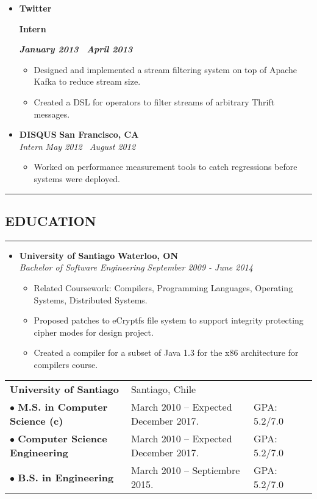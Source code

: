 \documentclass[10pt,letterpaper]{article}
\newcommand\textbox[1]{%
  \parbox{.333\textwidth}{#1}%
}
\newcommand{\sectionTitle}[1]{
  \hrule
  \vspace{-1.0em} 
  \subsection*{\uppercase{\textbf{#1}}}
  \vspace{-0.3em}
    \hrule
    \vspace{0.5em}  
}
\newcommand{\titleExperienceWithoutLocation}[4]{
  \item[]
  {
    \textbox{\textbf{#1}\hfill}\textbox{\hfil \textbf{#2}\hfil}\hfill \textbf{\emph{#3 \textendash \ #4}}
  }
}
\newcommand{\titleExperienceWithLocation}[5]{
  \item[]
  {
    \textbf{#1} \hfill
    \textbf{#2}
  }
  \\{\emph{#3} \hfill \emph{#4 \textendash \ #5}}
}
\begin{document}
\begin{itemize}[leftmargin=*]
    \titleExperienceWithoutLocation{Twitter}{Intern}{January 2013}{April 2013}
    \begin{itemize}[label=\textbullet]
      \itemsep0em
      \item Designed and implemented a stream filtering system on top of Apache
      Kafka to reduce stream size.
      \item Created a DSL for operators to filter streams of arbitrary Thrift
      messages.
    \end{itemize}
    
    \titleExperienceWithLocation{DISQUS}{San Francisco, CA}{Intern}{May 2012}{August 2012}
    \begin{itemize}[label=\textbullet]
      \itemsep0em
      \item Worked on performance measurement tools to catch regressions before
      systems were deployed.
    \end{itemize}
    
  \end{itemize}
  
  \sectionTitle{Education}  
  \begin{itemize}[leftmargin=*]
    \parskip=-0.5em
    
    \item[]
    {\textbf{University of Santiago} \hfill
      \textbf{Waterloo, ON}
    }
    \\
    {\emph{Bachelor of Software Engineering} \hfill
      \emph{September 2009 - June 2014}}
    
    \begin{itemize}[label=\textbullet]
      \item Related Coursework: Compilers, Programming Languages, Operating
      Systems, Distributed Systems.
      \item Proposed patches to eCryptfs file system to support
      integrity protecting cipher modes for design project.
      \item Created a compiler for a subset of Java 1.3 for the
      x86 architecture for compilers course.
    \end{itemize}
  \end{itemize}
  
  \begin{tabular}{lllc} 
    \textbf{University of Santiago}&Santiago, Chile& & \\
    $\bullet$ \textbf{M.S. in Computer Science (c)}& March 2010 – Expected December 2017. & GPA: 5.2/7.0 & \\
    $\bullet$ \textbf{Computer Science Engineering} & March 2010 – Expected December 2017. & GPA: 5.2/7.0 & \\
    $\bullet$ \textbf{B.S. in Engineering} & March 2010 – Septiembre 2015. & GPA: 5.2/7.0  &\\
  \end{tabular}
  
\end{document}
